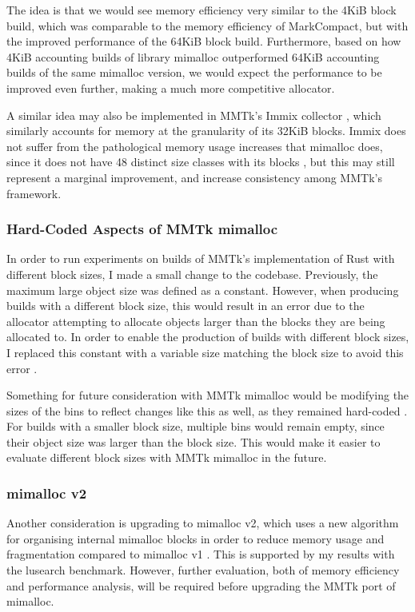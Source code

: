 \documentclass{article}
\begin{document}
The idea is that we would see memory efficiency very similar to the 4KiB block build, which was comparable to the memory efficiency of MarkCompact, but with the improved performance of the 64KiB block build. Furthermore, based on how 4KiB accounting builds of library mimalloc outperformed 64KiB accounting builds of the same mimalloc version, we would expect the performance to be improved even further, making a much more competitive allocator.

A similar idea may also be implemented in MMTk's Immix collector \cite{blackburn2008immix,mmtk-core}, which similarly accounts for memory at the granularity of its 32KiB blocks. Immix does not suffer from the pathological memory usage increases that mimalloc does, since it does not have 48 distinct size classes with its blocks \cite{blackburn2008immix}, but this may still represent a marginal improvement, and increase consistency among MMTk's framework.

\subsubsection{Hard-Coded Aspects of MMTk mimalloc}
In order to run experiments on builds of MMTk's implementation of Rust with different block sizes, I made a small change to the codebase. Previously, the maximum large object size was defined as a constant. However, when producing builds with a different block size, this would result in an error due to the allocator attempting to allocate objects larger than the blocks they are being allocated to. In order to enable the production of builds with different block sizes, I replaced this constant with a variable size matching the block size to avoid this error \cite{pr747}.

Something for future consideration with MMTk mimalloc would be modifying the sizes of the bins to reflect changes like this as well, as they remained hard-coded \cite{mmtk-core}. For builds with a smaller block size, multiple bins would remain empty, since their object size was larger than the block size. This would make it easier to evaluate different block sizes with MMTk mimalloc in the future.

\subsubsection{mimalloc v2}
Another consideration is upgrading to mimalloc v2, which uses a new algorithm for organising internal mimalloc blocks in order to reduce memory usage and fragmentation compared to mimalloc v1 \cite{mimalloc}. This is supported by my results with the lusearch benchmark. However, further evaluation, both of memory efficiency and performance analysis, will be required before upgrading the MMTk port of mimalloc.
\end{document}
